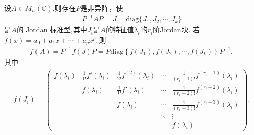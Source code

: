 \documentclass[../../main.tex]{subfiles}%
\begin{document}
\begin{proposition}
设$A\in M_n(\mathbb{C})$,则存在\(P\)是非异阵，使
\begin{align*}
P^{-1}AP = J = \mathrm{diag}\{J_1,J_2,\cdots,J_k\}
\end{align*}
是\(A\)的 Jordan 标准型,其中$J_i$是$A$的特征值$\lambda_i$的$r_i$阶Jordan块.
若$f(x)=a_0+a_1x+\cdots+a_px^p,$则
\begin{align*}
f(A)=P^{-1}f(J)P=P\mathrm{diag}\left\{ f\left( J_1 \right) ,f\left( J_2 \right) ,\cdots ,f\left( J_k \right) \right\} P^{-1},
\end{align*}
其中
\begin{align*}
f(J_i)= \begin{pmatrix}
f(\lambda_i) & \frac{1}{1!}f'(\lambda_i) & \frac{1}{2!}f^{(2)}(\lambda_i) & \cdots & \frac{1}{(r_i - 1)!}f^{(r_i - 1)}(\lambda_i) \\
& f(\lambda_i) & \frac{1}{1!}f'(\lambda_i) & \cdots & \frac{1}{(r_i - 2)!}f^{(r_i - 2)}(\lambda_i) \\
& & f(\lambda_i) & \cdots & \frac{1}{(r_i - 3)!}f^{(r_i - 3)}(\lambda_i) \\
& & & \ddots & \vdots \\
& & & & f(\lambda_i)
\end{pmatrix}. 
\end{align*}
\end{proposition}
\end{document}
